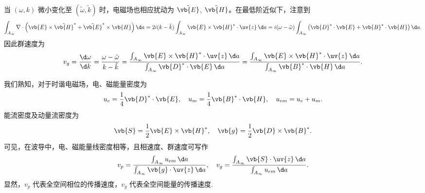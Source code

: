 当 \((\omega, k)\) 微小变化至 \((\tilde{\omega}, \tilde{k})\) 时，电磁场也相应扰动为 \(\tilde{\vb{E}}\), \(\tilde{\vb{H}}\)。在最低阶近似下，注意到
\begin{equation*}
	\int_{A_\infty} \nabla \cdot \left( \vb{E} \times \tilde{\vb{H}}^* + \tilde{\vb{E}}^* \times \vb{H} \right) \d a = 2i(k - \tilde{k}) \int_{A_\infty} \vb{E} \times \vb{H}^* \cdot \uv{z} \, \d a = i(\omega - \tilde{\omega}) \int_{A_\infty} \left( \vb{D}^* \cdot \vb{E} + \vb{B}^* \cdot \vb{H} \right) \d a.
\end{equation*}
因此群速度为
\begin{equation*}
	v_g = \dfrac{\d \omega}{\d k} = \dfrac{\omega - \tilde{\omega}}{k - \tilde{k}} = \dfrac{\int_{A_\infty} \vb{E} \times \vb{H}^* \cdot \uv{z} \, \d a}{\int_{A_\infty} \vb{D}^* \cdot \vb{E} \, \d a} = \dfrac{\int_{A_\infty} \vb{E} \times \vb{H}^* \cdot \uv{z} \, \d a}{\int_{A_\infty} \vb{B}^* \cdot \vb{H} \, \d a}.
\end{equation*}

我们熟知，对于时谐电磁场，电、磁能量密度为
\begin{equation*}
	u_e = \dfrac{1}{4} \vb{D}^* \cdot \vb{E}, \quad u_m = \dfrac{1}{4} \vb{B}^* \cdot \vb{H}, \quad u_{em} = u_e + u_m.
\end{equation*}
能流密度及动量流密度为
\begin{equation*}
	\vb{S} = \dfrac{1}{2} \vb{E} \times \vb{H}^*, \quad \vb{g} = \dfrac{1}{2} \vb{D} \times \vb{B}^*.
\end{equation*}
可见，在波导中，电、磁能量线密度相等，且相速度、群速度可写作
\begin{equation*}
	v_p = \dfrac{\int_{A_\infty} u_{em} \, \d a}{\int_{A_\infty} \vb{g} \cdot \uv{z} \, \d a}, \quad v_g = \dfrac{\int_{A_\infty} \vb{S} \cdot \uv{z} \, \d a}{\int_{A_\infty} u_{em} \, \d a}.
\end{equation*}
显然，\(v_p\) 代表全空间相位的传播速度，\(v_g\) 代表全空间能量的传播速度.

